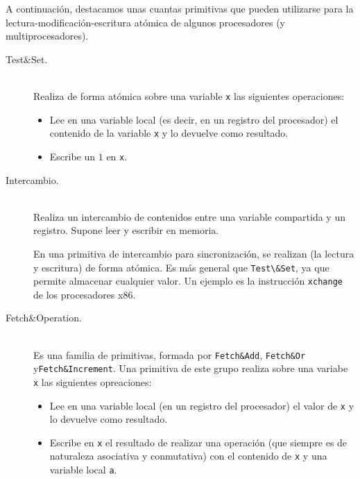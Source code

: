 A continuación, destacamos unas cuantas primitivas que pueden utilizarse para la lectura-modificación-escritura atómica de algunos procesadores (y multiprocesadores).
\begin{description}
    \item [Test\&Set.]~\\
        Realiza de forma atómica sobre una variable \verb|x| las siguientes operaciones:
        \begin{itemize}
            \item Lee en una variable local (es decir, en un registro del procesador) el contenido de la variable \verb|x| y lo devuelve como resultado.
            \item Escribe un $1$ en \verb|x|.
        \end{itemize}
    \item [Intercambio.]~\\
        Realiza un intercambio de contenidos entre una variable compartida y un registro. Supone leer y escribir en memoria. 

        En una primitiva de intercambio para sincronización, se realizan (la lectura y escritura) de forma atómica. Es más general que \verb|Test\&Set|, ya que permite almacenar cualquier valor. Un ejemplo es la instrucción \verb|xchange| de los procesadores x86.
    \item [Fetch\&Operation.]~\\
        Es una familia de primitivas, formada por \verb|Fetch&Add|, \verb|Fetch&Or| y\newline \verb|Fetch&Increment|. Una primitiva de este grupo realiza sobre una variabe \verb|x| las siguientes opreaciones:
        \begin{itemize}
            \item Lee en una variable local (en un registro del procesador) el valor de \verb|x| y lo devuelve como resultado.
            \item Escribe en \verb|x| el resultado de realizar una operación (que siempre es de naturaleza asociativa y conmutativa) con el contenido de \verb|x| y una variable local \verb|a|.


\end{itemize}
\end{description}
